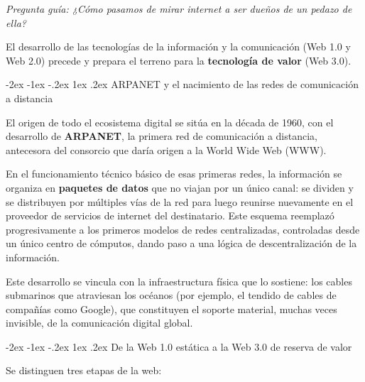 \documentclass[12pt,oneside]{book}
\makeatletter
\renewcommand\subsection{\@startsection{subsection}{2}{\z@}%
  {-2ex \@plus -1ex \@minus -.2ex}%
  {1ex \@plus .2ex}%
  {\normalfont\large\bfseries}}
\newcommand{\guia}[1]{\noindent\textit{Pregunta guía: #1}\par\smallskip}
\makeatother
\begin{document}
\guia{¿Cómo pasamos de mirar internet a ser dueños de un pedazo de ella?}

El desarrollo de las tecnologías de la información y la comunicación (Web 1.0 y Web 2.0) precede y prepara el terreno para la \textbf{tecnología de valor} (Web 3.0).

\subsection{ARPANET y el nacimiento de las redes de comunicación a distancia}

El origen de todo el ecosistema digital se sitúa en la década de 1960, con el desarrollo de \textbf{ARPANET}, la primera red de comunicación a distancia, antecesora del consorcio que daría origen a la World Wide Web (WWW).

En el funcionamiento técnico básico de esas primeras redes, la información se organiza en \textbf{paquetes de datos} que no viajan por un único canal: se dividen y se distribuyen por múltiples vías de la red para luego reunirse nuevamente en el proveedor de servicios de internet del destinatario. Este esquema reemplazó progresivamente a los primeros modelos de redes centralizadas, controladas desde un único centro de cómputos, dando paso a una lógica de descentralización de la información.

Este desarrollo se vincula con la infraestructura física que lo sostiene: los cables submarinos que atraviesan los océanos (por ejemplo, el tendido de cables de compañías como Google), que constituyen el soporte material, muchas veces invisible, de la comunicación digital global.

\subsection{De la Web 1.0 estática a la Web 3.0 de reserva de valor}

Se distinguen tres etapas de la web:
\end{document}
